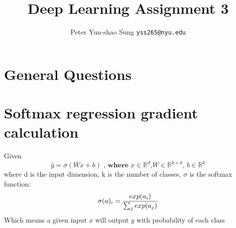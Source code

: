 \documentclass{article}
\title{Deep Learning Assignment 3}
\author{
  Peter Yun-shao Sung
  \texttt{yss265@nyu.edu} \\
}
\begin{document}

\maketitle
\section{General Questions}

\section{Softmax regression gradient calculation}
Given
\begin{equation}
\hat{y} = \sigma (Wx+b) \textbf{ , where $x \in \mathbb{R}^d$,$W \in \mathbb{R}^{k\times d}$, $b \in \mathbb{R}^k$}
\end{equation}
where d is the input dimension, k is the number of classes, $\sigma$ is the softmax function:
\begin{equation}
\sigma(a)_i = {exp(a_i) \over \sum_j exp(a_j)}
\end{equation}
Which means a given input $x$ will output $y$ with probability of each class
\end{document}
